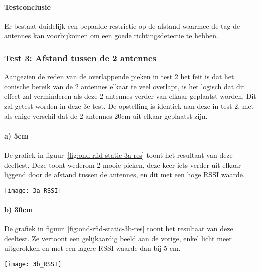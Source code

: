 \paragraph{Testconclusie}
Er bestaat duidelijk een bepaalde restrictie op de afstand waarmee de tag de antennes kan voorbijkomen om een goede richtingsdetectie te hebben. 

\subsubsection{Test 3: Afstand tussen de 2 antennes}
\label{sec:ond-rfid-2-3}
Aangezien de reden van de overlappende pieken in test 2 het feit is dat het conische bereik van de 2 antennes elkaar te veel overlapt, is het logisch dat dit effect zal verminderen als deze 2 antennes verder van elkaar geplaatst worden. Dit zal getest worden in deze 3e test. De opstelling is identiek aan deze in test 2, met als enige verschil dat de 2 antennes 20cm uit elkaar geplaatst zijn.

\paragraph{a) 5cm}
\begin{minipage}{0.55\textwidth}
De grafiek in figuur~\ref{fig:ond-rfid-static-3a-res} toont het resultaat van deze deeltest. Deze toont wederom 2 mooie pieken, deze keer iets verder uit elkaar liggend door de afstand tussen de antennes, en dit met een hoge RSSI waarde.
\end{minipage}
\hfill
\begin{minipage}{0.42\textwidth}
	\texttt{[image: 3a\_RSSI]}
	\label{fig:ond-rfid-static-3a-res}
\end{minipage}

\paragraph{b) 30cm}
\begin{minipage}{0.55\textwidth}
De grafiek in figuur~\ref{fig:ond-rfid-static-3b-res} toont het resultaat van deze deeltest. Ze vertoont een gelijkaardig beeld aan de vorige, enkel licht meer uitgerokken en met een lagere RSSI waarde dan bij 5 cm.
\end{minipage}
\hfill
\begin{minipage}{0.42\textwidth}
	\texttt{[image: 3b\_RSSI]}
	\label{fig:ond-rfid-static-3b-res}
\end{minipage}

